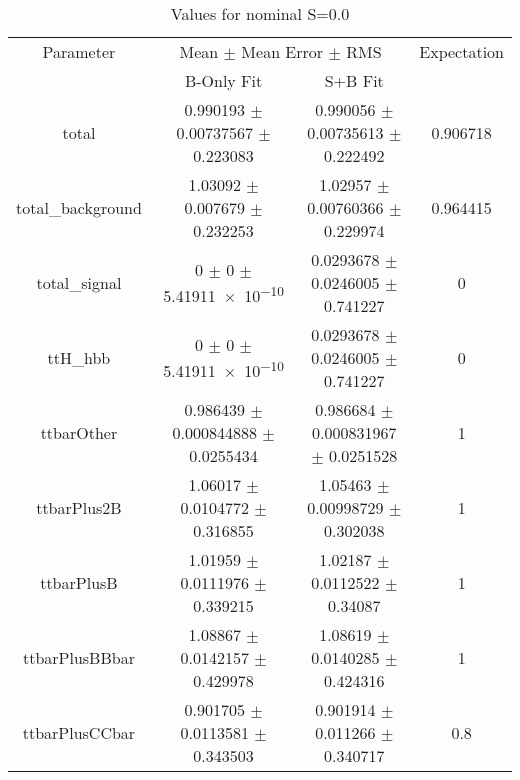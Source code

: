 \begin{table}
\centering
\caption{Values for nominal S=0.0}
\begin{tabular}{cccc}
\toprule
Parameter & \multicolumn{2}{c}{Mean $\pm$ Mean Error $\pm$ RMS} & Expectation\\
 & B-Only Fit & S+B Fit & \\
\midrule
total & \num{0.990193} $\pm$ \num{0.00737567} $\pm$ \num{0.223083} & \num{0.990056} $\pm$ \num{0.00735613} $\pm$ \num{0.222492} & \num{0.906718}\\
total\_background & \num{1.03092} $\pm$ \num{0.007679} $\pm$ \num{0.232253} & \num{1.02957} $\pm$ \num{0.00760366} $\pm$ \num{0.229974} & \num{0.964415}\\
total\_signal & \num{0} $\pm$ \num{0} $\pm$ \num{5.41911e-10} & \num{0.0293678} $\pm$ \num{0.0246005} $\pm$ \num{0.741227} & \num{0}\\
ttH\_hbb & \num{0} $\pm$ \num{0} $\pm$ \num{5.41911e-10} & \num{0.0293678} $\pm$ \num{0.0246005} $\pm$ \num{0.741227} & \num{0}\\
ttbarOther & \num{0.986439} $\pm$ \num{0.000844888} $\pm$ \num{0.0255434} & \num{0.986684} $\pm$ \num{0.000831967} $\pm$ \num{0.0251528} & \num{1}\\
ttbarPlus2B & \num{1.06017} $\pm$ \num{0.0104772} $\pm$ \num{0.316855} & \num{1.05463} $\pm$ \num{0.00998729} $\pm$ \num{0.302038} & \num{1}\\
ttbarPlusB & \num{1.01959} $\pm$ \num{0.0111976} $\pm$ \num{0.339215} & \num{1.02187} $\pm$ \num{0.0112522} $\pm$ \num{0.34087} & \num{1}\\
ttbarPlusBBbar & \num{1.08867} $\pm$ \num{0.0142157} $\pm$ \num{0.429978} & \num{1.08619} $\pm$ \num{0.0140285} $\pm$ \num{0.424316} & \num{1}\\
ttbarPlusCCbar & \num{0.901705} $\pm$ \num{0.0113581} $\pm$ \num{0.343503} & \num{0.901914} $\pm$ \num{0.011266} $\pm$ \num{0.340717} & \num{0.8}\\
\bottomrule
\end{tabular}
\end{table}